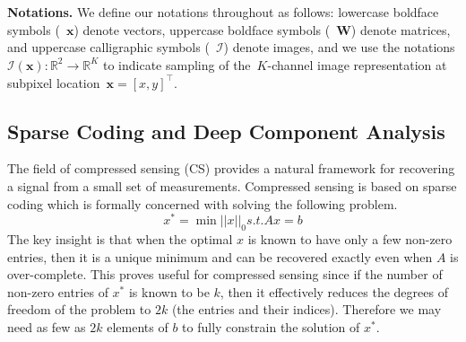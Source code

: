 \\
\\
\noindent\textbf{Notations.} We define our notations throughout as follows: lowercase boldface symbols (\eg~$\mathbf{x}$) denote vectors, uppercase boldface symbols (\eg~$\mathbf{W}$) denote matrices, and uppercase calligraphic symbols (\eg~$\mathcal{I}$) denote images,
 and we use the notations $\mathcal{I}(\mathbf{x}) : \mathbb{R}^2 \to \mathbb{R}^K$ to indicate sampling of the~$K$-channel image representation at subpixel location~$\mathbf{x} = [x,y]^{\top}$.
 
\subsection{Sparse Coding and Deep Component Analysis}
\label{sec:compr-sens-deep}

The field of compressed sensing (CS) provides a natural framework for recovering a signal from a small set of measurements. Compressed sensing is based on sparse coding which is formally concerned with solving the following problem. 
\begin{equation}
  \label{eq:1}
  x^* = \min \left||x\right||_0 s.t. Ax = b
\end{equation}
The key insight is that when the optimal $x$ is known to have only a few non-zero entries, then it is a unique minimum and can be recovered exactly even when $A$ is over-complete. This proves useful for compressed sensing since if the number of non-zero entries of $x^*$ is known to be $k$, then it effectively reduces the degrees of freedom of the problem to $2k$ (the entries and their indices). Therefore we may need as few as $2k$ elements of $b$ to fully constrain the solution of $x^{*}$.\\

